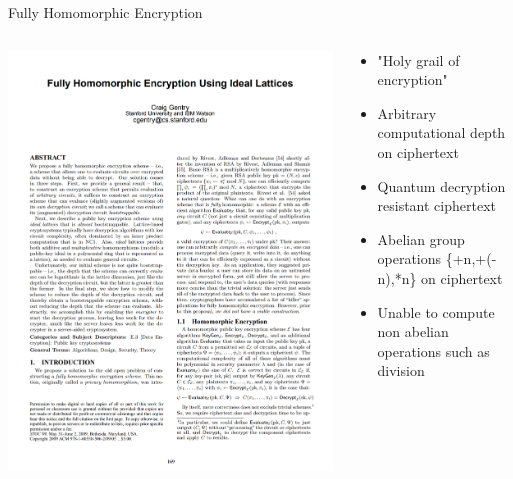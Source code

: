 \documentclass[aspectratio=169]{beamer}
\begin{document}
    \begin{frame}{Fully Homomorphic Encryption}
      \begin{columns}
        \begin{column}{0.5\textwidth}
          \includegraphics[width=0.75\linewidth]{gentry.png}
          \cite{gentry2009fully}
        \end{column}
        \begin{column}{0.5\textwidth}
          \begin{itemize}
            \item "Holy grail of encryption"
            \item Arbitrary computational depth on ciphertext
            \item Quantum decryption resistant ciphertext
            \item Abelian group operations \{+n,+(-n),*n\} on ciphertext
            \item Unable to compute non abelian operations such as division
          \end{itemize}
        \end{column}
      \end{columns}
    \end{frame}
\end{document}
